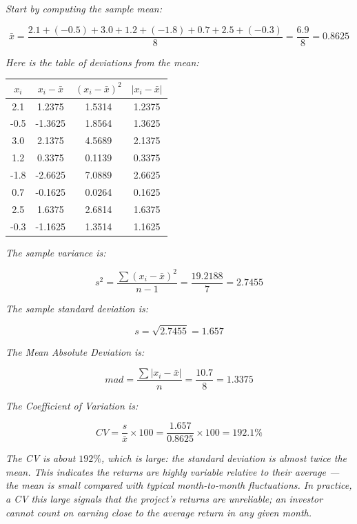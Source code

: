 \documentclass[
  11pt,
  letterpaper,
  DIV=11,
  numbers=noendperiod,
  oneside,
  open=any]{scrreprt}
\newenvironment{bsanswerkey}[2]{%
  \begin{tcolorbox}[bsbase, colback=bspaper2, colframe=bsline, fontupper=\small,
    title={\hypertarget{a-#1}{}\label{a-#1}\hyperlink{q-#1}{\textcolor{bsink2}{\MakeUppercase{#2}}}\hfill
      \hyperlink{q-#1}{\textcolor{bsaccent}{\normalfont\footnotesize back to page \pageref{q-#1}}}}]}%
  {\end{tcolorbox}}
\begin{document}
\begin{bsanswerkey}{bsans39}{Exercise 4}

\emph{Start by computing the sample mean:}

\[\bar{x} = \frac{2.1 + (-0.5) + 3.0 + 1.2 + (-1.8) + 0.7 + 2.5 + (-0.3)}{8} = \frac{6.9}{8} = 0.8625\]

\emph{Here is the table of deviations from the mean:}

\begin{center}
\begin{tabular}{cccc}
\toprule
\(x_{i}\) & \(x_{i}-\bar{x}\) & \((x_{i}-\bar{x})^2\) & \(|x_{i}-\bar{x}|\) \\
\midrule
2.1 & 1.2375 & 1.5314 & 1.2375 \\
-0.5 & -1.3625 & 1.8564 & 1.3625 \\
3.0 & 2.1375 & 4.5689 & 2.1375 \\
1.2 & 0.3375 & 0.1139 & 0.3375 \\
-1.8 & -2.6625 & 7.0889 & 2.6625 \\
0.7 & -0.1625 & 0.0264 & 0.1625 \\
2.5 & 1.6375 & 2.6814 & 1.6375 \\
-0.3 & -1.1625 & 1.3514 & 1.1625 \\
\bottomrule
\end{tabular}
\end{center}

\emph{The sample variance is:}

\[s^2 = \frac{\sum(x_i - \bar{x})^2}{n-1} = \frac{19.2188}{7} = 2.7455\]

\emph{The sample standard deviation is:}

\[s = \sqrt{2.7455} = 1.657\]

\emph{The Mean Absolute Deviation is:}

\[mad = \frac{\sum|x_i - \bar{x}|}{n} = \frac{10.7}{8} = 1.3375\]

\emph{The Coefficient of Variation is:}

\[CV = \frac{s}{\bar{x}} \times 100 = \frac{1.657}{0.8625} \times 100 = 192.1\%\]

\emph{The CV is about \(192\%\), which is large: the standard deviation
is almost twice the mean. This indicates the returns are highly variable
relative to their average --- the mean is small compared with typical
month-to-month fluctuations. In practice, a CV this large signals that
the project's returns are unreliable; an investor cannot count on
earning close to the average return in any given month.}

\end{bsanswerkey}
\end{document}
